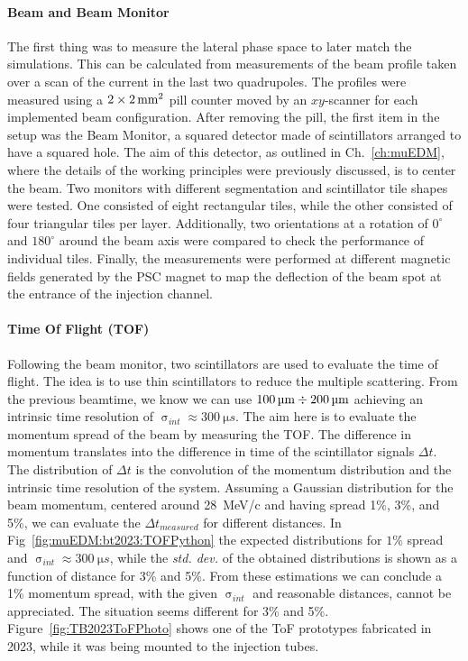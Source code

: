 \begin{refsection}
        \paragraph{Beam and Beam Monitor}
        The first thing was to measure the lateral phase space to later match the simulations.
        This can be calculated from measurements of the beam profile taken over a scan of the current in the last two quadrupoles. 
        The profiles were measured using a $2\times\SI{2}{mm\squared}$ pill counter moved by an $xy$-scanner for each implemented beam configuration.
        After removing the pill, the first item in the setup was the Beam Monitor, a squared detector made of scintillators arranged to have a squared hole.
        The aim of this detector, as outlined in Ch.~\ref{ch:muEDM}, where the details of the working principles were previously discussed, is to center the beam.
        Two monitors with different segmentation and scintillator tile shapes were tested.
        One consisted of eight rectangular tiles, while the other consisted of four triangular tiles per layer. 
        Additionally, two orientations at a rotation of $0^{\circ}$ and $180^{\circ}$ around the beam axis were compared to check the performance of individual tiles. 
        Finally, the measurements were performed at different magnetic fields generated by the PSC magnet to map the deflection of the beam spot at the entrance of the injection channel.
        
        \paragraph{Time Of Flight (TOF)}
        Following the beam monitor, two scintillators are used to evaluate the time of flight.
        The idea is to use thin scintillators to reduce the multiple scattering.
        From the previous beamtime, we know we can use $\SI{100}{\micro m}\divisionsymbol\SI{200}{\micro m}$ achieving an intrinsic time resolution of $\upsigma_{int}\approx\SI{300}{\micro s}$.
        The aim here is to evaluate the momentum spread of the beam by measuring the TOF.
        The difference in momentum translates into the difference in time of the scintillator signals $\Delta t$. 
        The distribution of $\Delta t$ is the convolution of the momentum distribution and the intrinsic time resolution of the system.
        Assuming a Gaussian distribution for the beam momentum, centered around \SI{28}{MeV/c} and having spread 1\%, 3\%, and 5\%, we can evaluate the $\Delta t_{measured}$ for different distances.
        In Fig~\ref{fig:muEDM:bt2023:TOFPython} the expected distributions for $1\%$ spread and $\upsigma_{int}\approx\SI{300}{\micro s}$, while the \textit{std. dev.} of the obtained distributions is shown as a function of distance for 3\% and 5\%.
        From these estimations we can conclude a 1\% momentum spread, with the given $\upsigma_{int}$ and reasonable distances, cannot be appreciated. 
        The situation seems different for 3\% and 5\%.
        Figure~\ref{fig:TB2023ToFPhoto} shows one of the ToF prototypes fabricated in 2023, while it was being mounted to the injection tubes. \\


\end{refsection}
